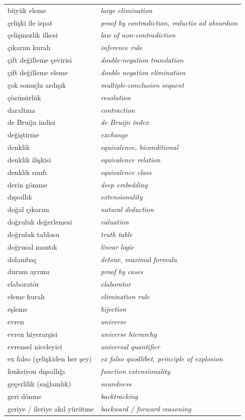 \begin{center}
\begin{tabularx}{\linewidth}{>{\raggedright\arraybackslash}X >{\raggedright\arraybackslash\itshape}X}
büyük eleme & large elimination \\
çelişki ile ispat & proof by contradiction, reductio ad absurdum \\
çelişmezlik ilkesi & law of non-contradiction \\
çıkarım kuralı & inference rule \\
çift değilleme çevirisi & double-negation translation \\
çift değilleme eleme & double negation elimination \\
çok sonuçlu ardışık & multiple-conclusion sequent \\
çözünürlük & resolution \\
daraltma & contraction \\
de Bruijn indisi & de Bruijn index \\
değiştirme & exchange \\
denklik & equivalence, biconditional \\
denklik ilişkisi & equivalence relation \\
denklik sınıfı & equivalence class \\
derin gömme & deep embedding \\
dışsallık & extensionality \\
doğal çıkarım & natural deduction \\
doğruluk değerlemesi & valuation \\
doğruluk tablosu & truth table \\
doğrusal mantık & linear logic \\
dolambaç & detour, maximal formula \\
durum ayrımı & proof by cases \\
elaboratör & elaborator \\
eleme kuralı & elimination rule \\
eşleme & bijection \\
evren & universe \\
evren hiyerarşisi & universe hierarchy \\
evrensel niceleyici & universal quantifier \\
ex falso (çelişkiden her şey) & ex falso quodlibet, principle of explosion \\
fonksiyon dışsallığı & function extensionality \\
geçerlilik (sağlamlık) & soundness \\
geri dönme & backtracking \\
geriye / ileriye akıl yürütme & backward / forward reasoning \\

\end{tabularx}
\end{center}
